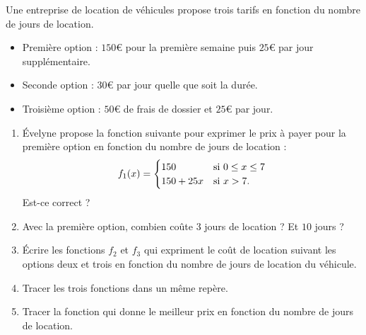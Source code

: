 
\begin{exercice}\label{exosmath-0138}

    Une entreprise de location de véhicules propose trois tarifs en fonction du nombre de jours de location.
    \begin{itemize}
        \item Première option : \( 150\)€ pour la première semaine puis \( 25\)€ par jour supplémentaire.
        \item
            Seconde option : \( 30\)€ par jour quelle que soit la durée.
        \item
            Troisième option : \( 50\)€ de frais de dossier et \( 25\)€ par jour.
    \end{itemize}
    \begin{enumerate}
        \item
            Évelyne propose la fonction suivante pour exprimer le prix à payer pour la première option en fonction du nombre de jours de location :
            \begin{equation}
                f_1(x)=\begin{cases}
                    150    &   \text{si \( 0\leq x\leq 7\)}\\
                    150+25x    &    \text{si \( x>7\).}
                \end{cases}
            \end{equation}
            Est-ce correct ?
        \item
            Avec la première option, combien coûte \( 3\) jours de location ? Et \( 10\) jours ?
        \item
            Écrire les fonctions \( f_2\) et \( f_3\) qui expriment le coût de location suivant les options deux et trois  en fonction du nombre de jours de location du véhicule.
        \item
            Tracer les trois fonctions dans un même repère.
        \item
            Tracer la fonction qui donne le meilleur prix en fonction du nombre de jours de location.
    \end{enumerate}

\end{exercice}
